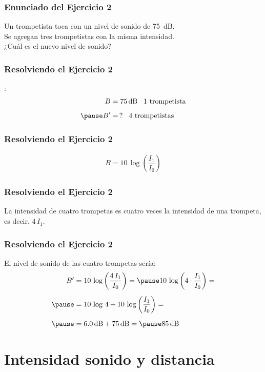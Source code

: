 \documentclass[14pt]{beamer}
\begin{document}
\begin{frame}
\frametitle{Enunciado del Ejercicio 2}
Un trompetista toca con un nivel de sonido de \SI{75}{\dB}. 
\\
\bigskip
\pause Se agregan tres trompetistas con la misma intensidad.
\\
\bigskip
\pause
¿Cuál es el nuevo nivel de sonido?
\end{frame}
\begin{frame}
\frametitle{Resolviendo el Ejercicio 2}
:
\pause
\begin{eqnarray*}
\begin{aligned}
B &= \SI{75}{\dB} \hspace{0.3cm} \text{1 trompetista} \\[0.5em] \pause
B^{\prime} &= \, ? \hspace{0.3cm} \text{4 trompetistas}
\end{aligned}
\end{eqnarray*}
\end{frame}
\begin{frame}
\frametitle{Resolviendo el Ejercicio 2}
\pause
\begin{align*}
B = 10 \,\log \left( \dfrac{I_{1}}{I_{0}} \right)
\end{align*}
\end{frame}
\begin{frame}
\frametitle{Resolviendo el Ejercicio 2}
La intensidad de cuatro trompetas es cuatro veces la intensidad de una trompeta, \pause es decir, $4 \, I_{1}$.
\end{frame}
\begin{frame}
\frametitle{Resolviendo el Ejercicio 2}
El nivel de sonido de las cuatro trompetas sería:
\pause
\begin{eqnarray*}
\begin{aligned}
B^{\prime} &= 10 \, \log \left( \dfrac{4 \, I_{1}}{I_{0}} \right) = \pause 10 \, \log \left( 4 \cdot \dfrac{I_{1}}{I_{0}} \right) = \\[0.5em] \pause
&= 10 \, \log \, 4 + 10 \, \log \left( \dfrac{I_{1}}{I_{0}} \right) = \\[0.5em] \pause
&= \SI{6.0}{\dB} + \SI{75}{\dB} = \pause \SI{85}{\dB}
\end{aligned}
\end{eqnarray*}
\end{frame}

\section{Intensidad sonido y distancia}
\end{document}
